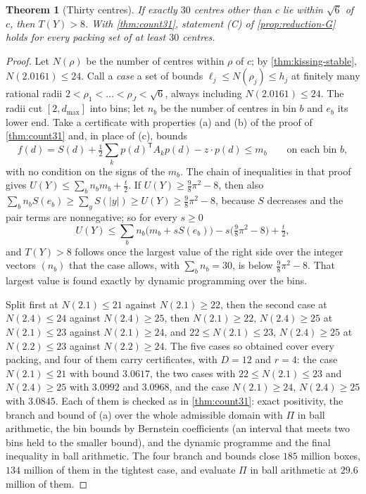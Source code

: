 \documentclass[11pt,reqno]{amsart}
\renewcommand{\_}{\origunderscore\allowbreak}
\numberwithin{equation}{section}
\theoremstyle{plain}
\newtheorem{thm}{Theorem}[section]
\theoremstyle{definition}
\theoremstyle{remark}
\begin{document}
\begin{thm}[Thirty centres]\label{thm:count30}
If exactly $30$ centres other than $c$ lie within $\sqrt6$ of $c$, then
$T(Y)>8$. With \cref{thm:count31}, statement (C) of \cref{prop:reduction-G}
holds for every packing set of at least $30$ centres.
\end{thm}

\begin{proof}
Let $N(\rho)$ be the number of centres within $\rho$ of $c$; by
\cref{thm:kissing-stable}, $N(2.0161)\le24$. Call a \emph{case} a set of
bounds $\ell_j\le N(\rho_j)\le h_j$ at finitely many rational radii
$2<\rho_1<\dots<\rho_J<\sqrt6$, always including $N(2.0161)\le24$. The radii cut
$[2,d_{\max}]$ into bins; let $n_b$ be the number of centres in bin $b$ and
$e_b$ its lower end. Take a certificate with properties (a) and (b) of the
proof of \cref{thm:count31} and, in place of (c), bounds
\[
  f(d)=S(d)+\tfrac12\textstyle\sum_kp(d)^{\mathsf T}A_kp(d)-z\cdot p(d)\le m_b
  \qquad\text{on each bin } b ,
\]
with no condition on the signs of the $m_b$. The chain of inequalities in that
proof gives $U(Y)\le\sum_bn_bm_b+\frac t2$. If $U(Y)\ge\frac98\pi^2-8$, then
also $\sum_bn_bS(e_b)\ge\sum_yS(|y|)\ge U(Y)\ge\frac98\pi^2-8$, because $S$
decreases and the pair terms are nonnegative; so for every $s\ge0$
\[
  U(Y)\le\sum_bn_b\bigl(m_b+sS(e_b)\bigr)-s\bigl(\tfrac98\pi^2-8\bigr)+\tfrac t2 ,
\]
and $T(Y)>8$ follows once the largest value of the right side over the
integer vectors $(n_b)$ that the case allows, with $\sum_bn_b=30$, is below
$\frac98\pi^2-8$. That largest value is found exactly by dynamic programming
over the bins.

Split first at $N(2.1)\le21$ against $N(2.1)\ge22$, then the second case
at $N(2.4)\le24$ against $N(2.4)\ge25$, then $N(2.1)\ge22$, $N(2.4)\ge25$ at
$N(2.1)\le23$ against $N(2.1)\ge24$, and $22\le N(2.1)\le23$, $N(2.4)\ge25$
at $N(2.2)\le23$ against $N(2.2)\ge24$. The five cases so obtained cover every
packing, and four of them carry certificates, with $D=12$ and $r=4$: the
case $N(2.1)\le21$ with bound $3.0617$, the two cases with $22\le N(2.1)\le23$
and $N(2.4)\ge25$ with $3.0992$ and $3.0968$, and the case $N(2.1)\ge24$,
$N(2.4)\ge25$ with $3.0845$. Each of them is checked as in
\cref{thm:count31}: exact positivity, the branch and bound of (a) over the
whole admissible domain with $\Pi$ in ball arithmetic, the bin bounds by
Bernstein coefficients (an interval that meets two bins held to the smaller
bound), and the dynamic programme and the final inequality in ball
arithmetic. The four branch and bounds close $185$ million boxes, $134$
million of them in the tightest case, and evaluate $\Pi$ in ball arithmetic
at $29.6$ million of them.


\end{proof}
\end{document}
